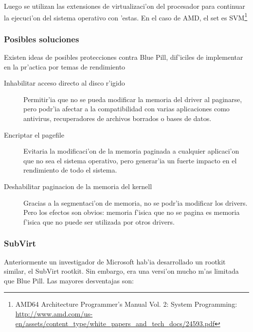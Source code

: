 Luego se utilizan las extensiones de virtualizaci'on del procesador para continuar la ejecuci'on del sistema operativo con 'estas. En el caso de AMD, el set es SVM\footnote{AMD64 Architecture Programmer's Manual Vol. 2: System Programming: \url{http://www.amd.com/us-en/assets/content_type/white_papers_and_tech_docs/24593.pdf}}

\subsubsection{Posibles soluciones}

Existen ideas de posibles protecciones contra Blue Pill, dif'iciles de implementar en la pr'actica por temas de rendimiento

\begin{description}

\item[Inhabilitar acceso directo al disco r'igido] Permitir'ia que no se pueda modificar la memoria del driver al paginarse, pero podr'ia afectar a la compatibilidad con varias aplicaciones como antivirus, recuperadores de archivos borrados o bases de datos.

\item[Encriptar el pagefile] Evitaria la modificaci'on de la memoria paginada a cualquier aplicaci'on que no sea el sistema operativo, pero generar'ia un fuerte impacto en el rendimiento de todo el sistema.

\item[Deshabilitar paginacion de la memoria del kernell] Gracias a la segmentaci'on de memoria, no se podr'ia modificar los drivers. Pero los efectos son obvios: memoria f'isica que no se pagina es memoria f'isica que no puede ser utilizada por otros drivers. 

\end{description}

\subsubsection{SubVirt}
 
Anteriormente un investigador de Microsoft hab'ia desarrollado un rootkit similar, el SubVirt rootkit. Sin embargo, era una versi'on mucho m'as limitada que Blue Pill. Las mayores desventajas son:

